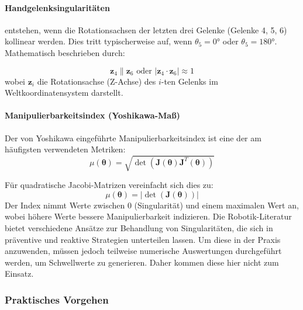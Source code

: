 \paragraph{Handgelenksingularitäten} entstehen, wenn die Rotationsachsen der
letzten drei Gelenke (Gelenke 4, 5, 6) kollinear werden. Dies tritt
typischerweise auf, wenn $\theta_5 = 0°$ oder $\theta_5 = 180°$. Mathematisch
beschrieben durch:

\begin{equation}
	\mathbf{z}_4 \parallel \mathbf{z}_6 \text{ oder } |\mathbf{z}_4 \cdot \mathbf{z}_6| \approx 1
	\label{eq:wrist_singularity}
\end{equation}
\noindent
wobei $\mathbf{z}_i$ die Rotationsachse (Z-Achse) des $i$-ten Gelenks im
Weltkoordinatensystem darstellt.

\paragraph{Manipulierbarkeitsindex (Yoshikawa-Maß)} Der von Yoshikawa
\cite{yoshikawa1985manipulability} eingeführte Manipulierbarkeitsindex ist eine
der am häufigsten verwendeten Metriken: \begin{equation}
	\mu(\boldsymbol{\theta}) =
	\sqrt{\det(\mathbf{J}(\boldsymbol{\theta})\mathbf{J}^T(\boldsymbol{\theta}))}
	\label{eq:yoshikawa_measure} \end{equation}

Für quadratische Jacobi-Matrizen vereinfacht sich dies zu: \begin{equation}
	\mu(\boldsymbol{\theta}) = |\det(\mathbf{J}(\boldsymbol{\theta}))|
	\label{eq:yoshikawa_simplified} \end{equation}
\noindent
Der Index nimmt Werte zwischen 0 (Singularität) und einem maximalen Wert an,
wobei höhere Werte bessere Manipulierbarkeit indizieren. Die Robotik-Literatur
bietet verschiedene Ansätze zur Behandlung von Singularitäten, die sich in
präventive und reaktive Strategien unterteilen lassen. Um diese in der Praxis
anzuwenden, müssen jedoch teilweise numerische Auswertungen durchgeführt werden,
um Schwellwerte zu generieren. Daher kommen diese hier nicht zum Einsatz.

\subsubsection{Praktisches Vorgehen} \label{sssec:Framework_Implementierung}


